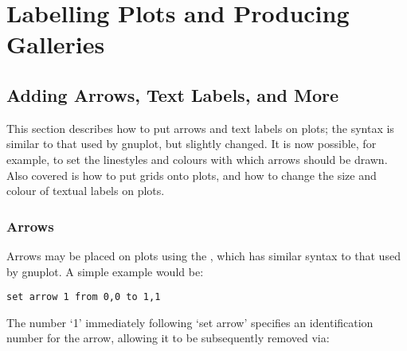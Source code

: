 %
%
%
%
%



\chapter{Labelling Plots and Producing Galleries}

\section{Adding Arrows, Text Labels, and More}

This section describes how to put arrows and text labels on plots; the syntax
is similar to that used by gnuplot, but slightly changed. It is now possible,
for example, to set the linestyles and colours with which arrows should be
drawn.  Also covered is how to put grids onto plots, and how to change the size
and colour of textual labels on plots.

\subsection{Arrows}

\label{set_arrow} Arrows may be placed on plots using the
, which has similar syntax to that used by gnuplot. A simple
example would be:

\begin{verbatim}
set arrow 1 from 0,0 to 1,1
\end{verbatim}

\noindent The number `1' immediately following `set arrow' specifies an identification
number for the arrow, allowing it to be subsequently removed via:

